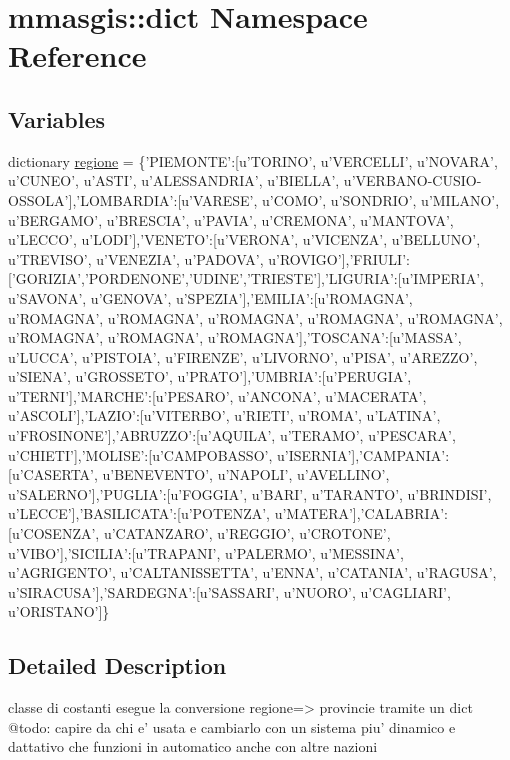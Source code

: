 \hypertarget{namespacemmasgis_1_1dict}{
\section{mmasgis::dict Namespace Reference}
\label{namespacemmasgis_1_1dict}
}
\subsection*{Variables}
\begin{DoxyCompactItemize}
\item 
dictionary \hyperlink{namespacemmasgis_1_1dict_adebad840f47703d850d6cc38a0ae0ba1}{regione} = \{'PIEMONTE':\mbox{[}u'TORINO', u'VERCELLI', u'NOVARA', u'CUNEO', u'ASTI', u'ALESSANDRIA', u'BIELLA', u'VERBANO-\/CUSIO-\/OSSOLA'\mbox{]},'LOMBARDIA':\mbox{[}u'VARESE', u'COMO', u'SONDRIO', u'MILANO', u'BERGAMO', u'BRESCIA', u'PAVIA', u'CREMONA', u'MANTOVA', u'LECCO', u'LODI'\mbox{]},'VENETO':\mbox{[}u'VERONA', u'VICENZA', u'BELLUNO', u'TREVISO', u'VENEZIA', u'PADOVA', u'ROVIGO'\mbox{]},'FRIULI':\mbox{[}'GORIZIA','PORDENONE','UDINE','TRIESTE'\mbox{]},'LIGURIA':\mbox{[}u'IMPERIA', u'SAVONA', u'GENOVA', u'SPEZIA'\mbox{]},'EMILIA':\mbox{[}u'ROMAGNA', u'ROMAGNA', u'ROMAGNA', u'ROMAGNA', u'ROMAGNA', u'ROMAGNA', u'ROMAGNA', u'ROMAGNA', u'ROMAGNA'\mbox{]},'TOSCANA':\mbox{[}u'MASSA', u'LUCCA', u'PISTOIA', u'FIRENZE', u'LIVORNO', u'PISA', u'AREZZO', u'SIENA', u'GROSSETO', u'PRATO'\mbox{]},'UMBRIA':\mbox{[}u'PERUGIA', u'TERNI'\mbox{]},'MARCHE':\mbox{[}u'PESARO', u'ANCONA', u'MACERATA', u'ASCOLI'\mbox{]},'LAZIO':\mbox{[}u'VITERBO', u'RIETI', u'ROMA', u'LATINA', u'FROSINONE'\mbox{]},'ABRUZZO':\mbox{[}u'AQUILA', u'TERAMO', u'PESCARA', u'CHIETI'\mbox{]},'MOLISE':\mbox{[}u'CAMPOBASSO', u'ISERNIA'\mbox{]},'CAMPANIA':\mbox{[}u'CASERTA', u'BENEVENTO', u'NAPOLI', u'AVELLINO', u'SALERNO'\mbox{]},'PUGLIA':\mbox{[}u'FOGGIA', u'BARI', u'TARANTO', u'BRINDISI', u'LECCE'\mbox{]},'BASILICATA':\mbox{[}u'POTENZA', u'MATERA'\mbox{]},'CALABRIA':\mbox{[}u'COSENZA', u'CATANZARO', u'REGGIO', u'CROTONE', u'VIBO'\mbox{]},'SICILIA':\mbox{[}u'TRAPANI', u'PALERMO', u'MESSINA', u'AGRIGENTO', u'CALTANISSETTA', u'ENNA', u'CATANIA', u'RAGUSA', u'SIRACUSA'\mbox{]},'SARDEGNA':\mbox{[}u'SASSARI', u'NUORO', u'CAGLIARI', u'ORISTANO'\mbox{]}\}
\end{DoxyCompactItemize}


\subsection{Detailed Description}
\begin{DoxyVerb}
classe di costanti
 esegue la conversione regione=> provincie
tramite un dict
@todo: capire da chi e' usata e cambiarlo con un sistema piu' dinamico e dattativo che funzioni in automatico anche con altre nazioni  
\end{DoxyVerb}
 


